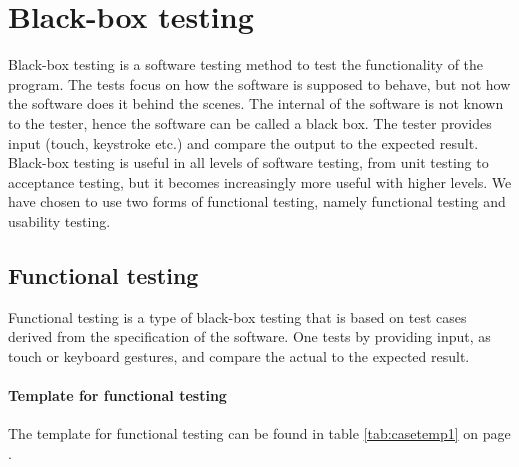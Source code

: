 
\section{Black-box testing}
Black-box testing \cite{bib:blackbox} \cite{bib:bbfun} is a software testing method to test the functionality of the program. The tests focus on how the software is supposed to behave, but not how the software does it behind the scenes. The internal of the software is not known to the tester, hence the software can be called a black box. The tester provides input (touch, keystroke etc.) and compare the output to the expected result. Black-box testing is useful in all levels of software testing, from unit testing to acceptance testing, but it becomes increasingly more useful with higher levels. 
\newline
\newline
We have chosen to use two forms of functional testing, namely functional testing and usability testing. 

\subsection{Functional testing}\label{subsec:functionaltesting}
Functional testing \cite{bib:funtest} is a type of black-box testing that is based on test cases derived from the specification of the software. One tests by providing input, as touch or keyboard gestures, and compare the actual to the expected result. 

\paragraph{Template for functional testing}\hfill
\newline		
The template for functional testing can be found in table \ref{tab:casetemp1} on page \pageref{tab:casetemp1}.	


